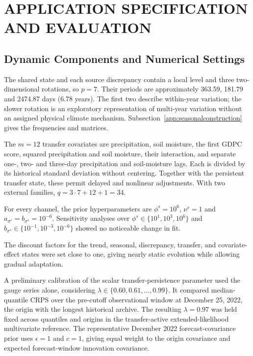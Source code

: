 \documentclass[APA,STIX1COL]{WileyNJD-v2}
\begin{document}
\section{APPLICATION SPECIFICATION AND EVALUATION}
\label{sec:evaluation}

\subsection{Dynamic Components and Numerical Settings}
\label{subsec:specification}

The shared state and each source discrepancy contain a local level and three two-dimensional rotations, so $p=7$. Their periods are approximately 363.59, 181.79 and 2474.87 days (6.78 years). The first two describe within-year variation; the slower rotation is an exploratory representation of multi-year variation without an assigned physical climate mechanism. Subsection~\ref{app:seasonalconstruction} gives the frequencies and matrices.

The $m=12$ transfer covariates are precipitation, soil moisture, the first GDPC score, squared precipitation and soil moisture, their interaction, and separate one-, two- and three-day precipitation and soil-moisture lags. Each is divided by its historical standard deviation without centering. Together with the persistent transfer state, these permit delayed and nonlinear adjustments. With two external families, $q=3\cdot7+12+1=34$.

For every channel, the prior hyperparameters are $\phi^s=10^6$, $\nu^s=1$ and $a_{\sigma^s}=b_{\sigma^s}=10^{-6}$. Sensitivity analyses over $\phi^s\in\{10^1,10^3,10^6\}$ and $b_{\sigma^s}\in\{10^{-1},10^{-3},10^{-6}\}$ showed no noticeable change in fit.

The discount factors for the trend, seasonal, discrepancy, transfer, and covariate-effect states were set close to one, giving nearly static evolution while allowing gradual adaptation.

A preliminary calibration of the scalar transfer-persistence parameter used the gauge series alone, considering $\lambda\in\{0.60,0.61,\ldots,0.99\}$. It compared median-quantile CRPS over the pre-cutoff observational window at December 25, 2022, the origin with the longest historical archive. The resulting $\lambda=0.97$ was held fixed across quantiles and origins in the transfer-active extended-likelihood multivariate reference. The representative December 2022 forecast-covariance prior uses $\epsilon=1$ and $c=1$, giving equal weight to the origin covariance and expected forecast-window innovation covariance.
\end{document}
